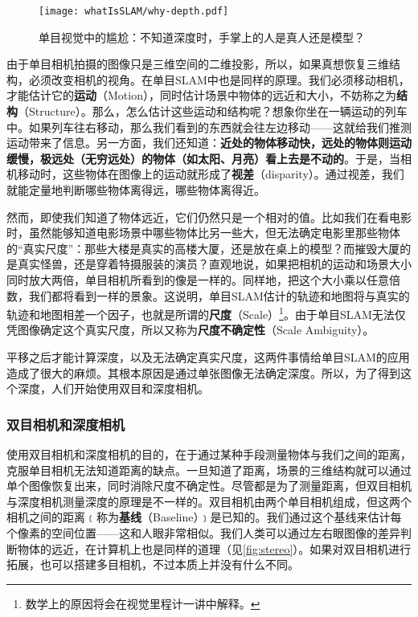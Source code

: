 \begin{figure}[!htp]
	\centering
	\texttt{[image: whatIsSLAM/why-depth.pdf]}
	\caption{单目视觉中的尴尬：不知道深度时，手掌上的人是真人还是模型？}
	\label{fig:why-depth}
\end{figure}

由于单目相机拍摄的图像只是三维空间的二维投影，所以，如果真想恢复三维结构，必须改变相机的视角。在单目SLAM中也是同样的原理。我们必须移动相机，才能估计它的\textbf{运动}（Motion），同时估计场景中物体的远近和大小，不妨称之为\textbf{结构}（Structure）。那么，怎么估计这些运动和结构呢？想象你坐在一辆运动的列车中。如果列车往右移动，那么我们看到的东西就会往左边移动——这就给我们推测运动带来了信息。另一方面，我们还知道：\textbf{近处的物体移动快，远处的物体则运动缓慢，极远处（无穷远处）的物体（如太阳、月亮）看上去是不动的}。于是，当相机移动时，这些物体在图像上的运动就形成了\textbf{视差}（disparity）。通过视差，我们就能定量地判断哪些物体离得远，哪些物体离得近。

然而，即使我们知道了物体远近，它们仍然只是一个相对的值。比如我们在看电影时，虽然能够知道电影场景中哪些物体比另一些大，但无法确定电影里那些物体的“真实尺度”：那些大楼是真实的高楼大厦，还是放在桌上的模型？而摧毁大厦的是真实怪兽，还是穿着特摄服装的演员？直观地说，如果把相机的运动和场景大小同时放大两倍，单目相机所看到的像是一样的。同样地，把这个大小乘以任意倍数，我们都将看到一样的景象。这说明，单目SLAM估计的轨迹和地图将与真实的轨迹和地图相差一个因子，也就是所谓的\textbf{尺度}（Scale）\footnote{数学上的原因将会在视觉里程计一讲中解释。}。由于单目SLAM无法仅凭图像确定这个真实尺度，所以又称为\textbf{尺度不确定性}（Scale Ambiguity）。

平移之后才能计算深度，以及无法确定真实尺度，这两件事情给单目SLAM的应用造成了很大的麻烦。其根本原因是通过单张图像无法确定深度。所以，为了得到这个深度，人们开始使用双目和深度相机。

\subsubsection{双目相机和深度相机}

使用双目相机和深度相机的目的，在于通过某种手段测量物体与我们之间的距离，克服单目相机无法知道距离的缺点。一旦知道了距离，场景的三维结构就可以通过单个图像恢复出来，同时消除尺度不确定性。尽管都是为了测量距离，但双目相机与深度相机测量深度的原理是不一样的。双目相机由两个单目相机组成，但这两个相机之间的距离﹝称为\textbf{基线}（Baseline）﹞是已知的。我们通过这个基线来估计每个像素的空间位置——这和人眼非常相似。我们人类可以通过左右眼图像的差异判断物体的远近，在计算机上也是同样的道理（见\autoref{fig:stereo}）。如果对双目相机进行拓展，也可以搭建多目相机，不过本质上并没有什么不同。

